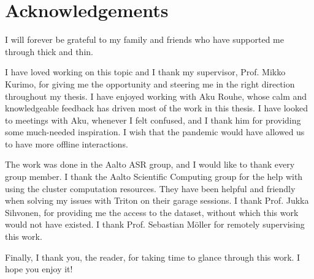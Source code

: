 \chapter*{Acknowledgements}
I will forever be grateful to my family and friends who have supported me through thick and thin. 

I have loved working on this topic and I thank my supervisor, Prof. Mikko Kurimo, for giving me the opportunity and steering me in the right direction throughout my thesis. I have enjoyed working with Aku Rouhe, whose calm and knowledgeable feedback has driven most of the work in this thesis. I have looked to meetings with Aku, whenever I felt confused, and I thank him for providing some much-needed inspiration. I wish that the pandemic would have allowed us to have more offline interactions. 

The work was done in the Aalto ASR group, and I would like to thank every group member. I thank the Aalto Scientific Computing group for the help with using the cluster computation resources. They have been helpful and friendly when solving my issues with Triton on their garage sessions. I thank Prof. Jukka Sihvonen, for providing me the access to the dataset, without which this work would not have existed. I thank Prof. Sebastian M\"oller for remotely supervising this work.

Finally, I thank you, the reader, for taking time to glance through this work. I hope you enjoy it!